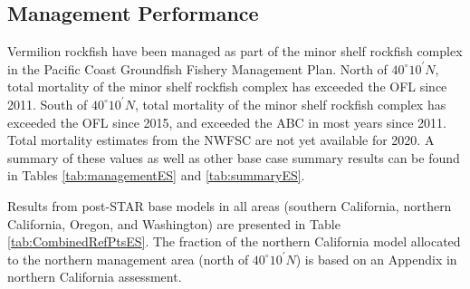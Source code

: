 \documentclass[11pt,
  english,
]{article}
\begin{document}
\FloatBarrier


\hypertarget{management-performance}{%
\subsection*{Management Performance}\label{management-performance}}

\leavevmode\tagmcend\tagstructend

Vermilion rockfish have been managed as part of the minor shelf rockfish complex in the Pacific Coast Groundfish Fishery Management Plan. North of $40^\circ 10^\prime N$, total mortality of the minor shelf rockfish complex has exceeded the OFL since 2011. South of $40^\circ 10^\prime N$, total mortality of the minor shelf rockfish complex has exceeded the OFL since 2015, and exceeded the ABC in most years since 2011. Total mortality estimates from the NWFSC are not yet available for 2020. A summary of these values as well as other base case summary results can be found in Tables \ref{tab:managementES} and \ref{tab:summaryES}.

Results from post-STAR base models in all areas (southern California, northern California, Oregon, and Washington) are presented in Table \ref{tab:CombinedRefPtsES}. The fraction of the northern California model allocated to the northern management area (north of $40^\circ 10^\prime N$) is based on an Appendix in northern California assessment.
\end{document}
